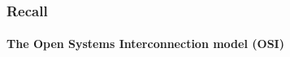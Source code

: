 \begin{frame}		
	
	\frametitle{Recall}
	\framesubtitle{The Open Systems Interconnection model (OSI)}
	
	\begin{columns}
	\begin{column}{0.5\textwidth}
		\begin{figure}[H]
		\end{figure}
		\centering
	\end{column}
	\begin{column}{0.5\textwidth}  %
	
	\end{column}
\end{columns}
	
	
\end{frame}